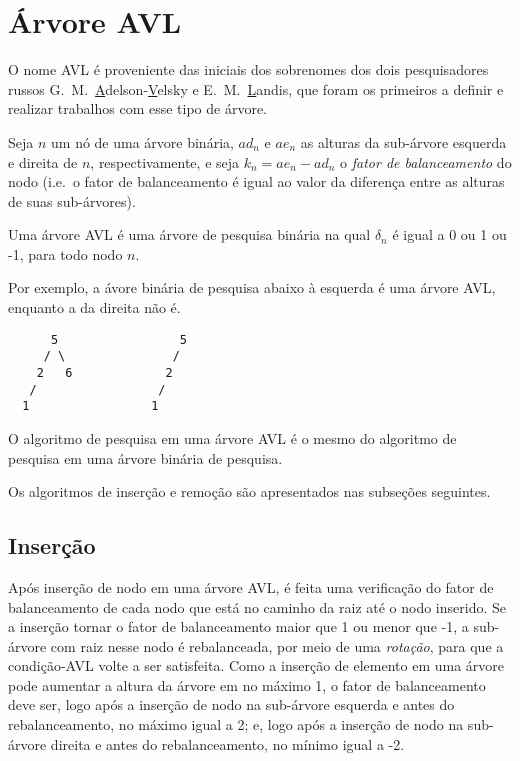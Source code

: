 \section{Árvore AVL}
\label{sec:arvore-AVL}

O nome AVL é proveniente das iniciais dos sobrenomes dos dois
pesquisadores russos G.~M.~\underline{A}delson-\underline{V}elsky e
E.~M.~\underline{L}andis, que foram os primeiros a definir e realizar
trabalhos com esse tipo de árvore.

Seja $n$ um nó de uma árvore binária, $ad_n$ e $ae_n$ as alturas da
sub-árvore esquerda e direita de $n$, respectivamente, e seja $k_n =
ae_n - ad_n $ o {\em fator de balanceamento\/} do nodo (i.e.~o fator
de balanceamento é igual ao valor da diferença entre as alturas de
suas sub-árvores).

Uma árvore AVL é uma árvore de pesquisa binária na qual $\delta_n$ é
igual a 0 ou 1 ou -1, para todo nodo $n$.

Por exemplo, a ávore binária de pesquisa abaixo à esquerda é uma
árvore AVL, enquanto a da direita não é. 

\begin{verbatim}
      5                 5
     / \               /
    2   6             2 
   /                 / 
  1                 1   
\end{verbatim}

O algoritmo de pesquisa em uma árvore AVL é o mesmo do algoritmo de
pesquisa em uma árvore binária de pesquisa. 

Os algoritmos de inserção e remoção são apresentados nas subseções
seguintes.

\subsection{Inserção}
\label{sec:insercao-em-arvores-AVL-versao-func}

Após inserção de nodo em uma árvore AVL, é feita uma verificação do
fator de balanceamento de cada nodo que está no caminho da raiz até o
nodo inserido. Se a inserção tornar o fator de balanceamento maior que
1 ou menor que -1, a sub-árvore com raiz nesse nodo é rebalanceada,
por meio de uma {\em rotação}, para que a condição-AVL volte a ser
satisfeita. Como a inserção de elemento em uma árvore pode aumentar a
altura da árvore em no máximo 1, o fator de balanceamento deve ser,
logo após a inserção de nodo na sub-árvore esquerda e antes do
rebalanceamento, no máximo igual a 2; e, logo após a inserção de nodo
na sub-árvore direita e antes do rebalanceamento, no mínimo igual a
-2.

